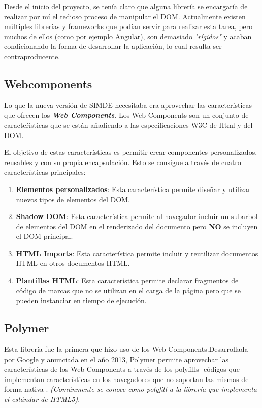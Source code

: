 Desde el inicio del proyecto, se tenía claro que alguna librería se encargaría de realizar 
por mí el tedioso proceso de manipular el DOM. Actualmente existen múltiples librerías 
y frameworks que podían servir para realizar esta tarea, pero muchos de ellos (como por ejemplo Angular),
son demasiado \textit{"rígidos"} y acaban condicionando la forma de desarrollar la aplicación, 
lo cual resulta ser contraproducente.

\subsection{Webcomponents}

\bigskip
Lo que la nueva versión de SIMDE necesitaba era aprovechar las características que ofrecen los
\textit\textbf{Web Components}. Los Web Components son un conjunto de caracteŕisticas que se 
están añadiendo a las especificaciones W3C de Html y del DOM. \cite{Webcomponents}

\bigskip 
El objetivo de estas características es permitir crear componentes personalizados, reusables y 
con su propia encapsulación. Esto se consigue a través de cuatro características principales:

\begin{enumerate}

\item \textbf{Elementos personalizados}: Esta característica permite diseñar y utilizar nuevos tipos 
de elementos del DOM.
\item \textbf{Shadow DOM}: Esta característica permite al navegador incluir un subarbol de elementos del 
DOM en el renderizado del documento pero \textbf{NO} se incluyen el DOM principal.
\item \textbf{HTML Imports}: Esta característica permite incluir y reutilizar documentos HTML en otros 
documentos HTML.
\item \textbf{Plantillas HTML}: Esta característica permite declarar fragmentos de código de marcas que no
se utilizan en el carga de la página pero que se pueden instanciar en tiempo de ejecución. 

\end{enumerate}

\subsection{Polymer}
Esta librería fue la primera que hizo uso de los Web Components.Desarrollada por Google y anunciada en 
el año 2013, Polymer permite aprovechar las características de los Web Components \cite{Polymer} a través de los polyfills 
-códigos que implementan características en los navegadores que no soportan las mismas de forma nativa-.
\textit{(Comúnmente se conoce como polyfill a la librería que implementa el estándar de HTML5)}. \cite{Polyfill} 

